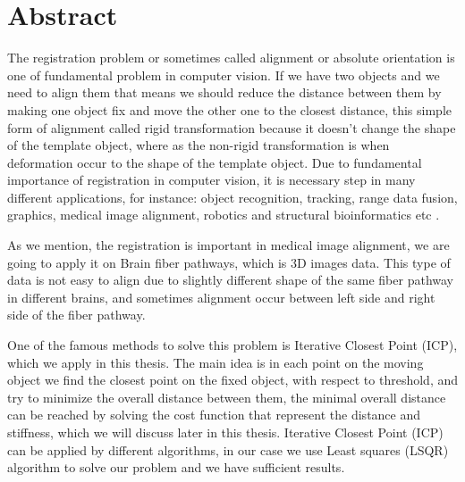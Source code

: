 \documentclass[../structure.tex]{subfiles}
\begin{document}
\chapter{Abstract}
The registration problem or sometimes called alignment or absolute orientation is one of fundamental problem in computer vision. If we have two objects and we need to align them that means we should reduce the distance between them by making one object fix and move the other one to the closest distance, this simple form of alignment called rigid transformation because it doesn't change the shape of the template object, where as the non-rigid transformation is when deformation occur to the shape of the template object. Due to fundamental importance of registration in computer vision, it is necessary step in many different applications, for instance: object recognition, tracking, range data fusion, graphics, medical image alignment, robotics and structural bioinformatics etc \cite{Li2007}.

As we mention, the registration is important in medical image alignment, we are going to apply it on Brain fiber pathways, which is 3D images data. This type of data is not easy to align due to slightly different shape of the same fiber pathway in different brains, and sometimes alignment occur between left side and right side of the fiber pathway.

One of the famous methods to solve this problem is Iterative Closest Point (ICP), which we apply in this thesis. The main idea is in each point on the moving object we find the closest point on the fixed object, with respect to threshold, and try to minimize the overall distance between them, the minimal overall distance can be reached by solving the cost function that represent the distance and stiffness, which we will discuss later in this thesis. Iterative Closest Point (ICP) can be applied by different algorithms, in our case we use Least squares (LSQR) algorithm to solve our problem and we have sufficient results.
\end{document}
